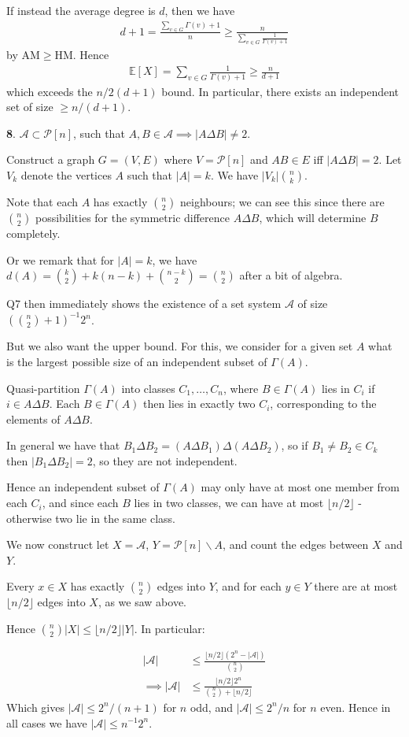\documentclass[]{article}
\theoremstyle{custhm}
\theoremstyle{cusdef}
\theoremstyle{custhm}
\theoremstyle{custhm}
\theoremstyle{custhm}
\theoremstyle{custhm}
\theoremstyle{cusdef}
\theoremstyle{remark}
\newcommand{\E}{\mathbb{E}}
\newcommand{\A}{\mathcal{A}}
\begin{document}
If instead the average degree is $d$, then we have
\begin{align*}
d + 1 = \frac{\sum_{v\in G}\Gamma(v)+1}{n} \ge \frac{n}{\sum_{v\in G}\frac{1}{\Gamma(v)+1}}
\end{align*}
by AM$\ge$HM. Hence
\begin{align*}
\E[X] = \sum_{v\in G} \frac{1}{\Gamma(v)+1}\ge \frac{n}{d+1}
\end{align*}
which exceeds the $n/2(d+1)$ bound. In particular, there exists an independent set of size $\ge n/(d+1)$.

\textbf{8}. $\mathcal{A}\subset \mathcal{P}[n]$, such that $A,B\in \mathcal{A}\implies |A\Delta B| \ne 2$.

Construct a graph $G = (V,E)$ where $V = \mathcal{P}[n]$ and $AB\in E$ iff $|A\Delta B| = 2$. Let $V_k$ denote the vertices $A$ such that $|A| = k$. We have $|V_k| \binom{n}{k}$.

Note that each $A$ has exactly $\binom{n}{2}$ neighbours; we can see this since there are $\binom{n}{2}$ possibilities for the symmetric difference $A\Delta B$, which will determine $B$ completely.

Or we remark that for $|A| = k$, we have $d(A) = \binom{k}{2} + k(n-k) + \binom{n-k}{2} = \binom{n}{2}$ after a bit of algebra.

Q7 then immediately shows the existence of a set system $\A$ of size $\left(\binom{n}{2}+1\right)^{-1}2^n$.

But we also want the upper bound. For this, we consider for a given set $A$ what is the largest possible size of an independent subset of $\Gamma(A)$.

Quasi-partition $\Gamma(A)$ into classes $C_1,\dots,C_n$, where $B\in \Gamma(A)$ lies in $C_i$ if $i\in A\Delta B$. Each $B\in \Gamma(A)$ then lies in exactly two $C_i$, corresponding to the elements of $A\Delta B$.

In general we have that $B_1\Delta B_2 = (A\Delta B_1)\Delta (A\Delta B_2)$, so if $B_1\ne B_2 \in C_k$ then $|B_1\Delta B_2| = 2$, so they are not independent.

Hence an independent subset of $\Gamma(A)$ may only have at most one member from each $C_i$, and since each $B$ lies in two classes, we can have at most $\lfloor n/2 \rfloor$ - otherwise two lie in the same class.

We now construct let $X = \A$, $Y = \mathcal{P}[n]\backslash A$, and count the edges between $X$ and $Y$.

Every $x\in X$ has exactly $\binom{n}{2}$ edges into $Y$, and for each $y\in Y$ there are at most $\lfloor n/2 \rfloor$ edges into $X$, as we saw above.

Hence $\binom{n}{2}|X| \le \lfloor n/2\rfloor |Y|$. In particular:

\begin{align*}
|\A| &\le \frac{\lfloor n/2 \rfloor (2^n - |\A|)}{\binom{n}{2}}\\
\implies |\A|&\le \frac{\lfloor n/2 \rfloor 2^n}{\binom{n}{2}+\lfloor n/2 \rfloor} 
\end{align*}
Which gives $|\A| \le 2^n/(n+1)$ for $n$ odd, and $|\A| \le 2^n/n$ for $n$ even. Hence in all cases we have $|\A| \le n^{-1}2^n$.
\end{document}

